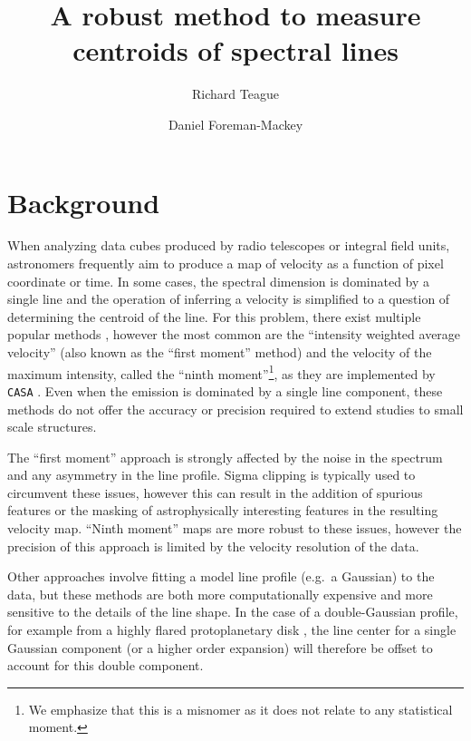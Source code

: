 \documentclass[rnaas]{aastex62}
\begin{document}
\raggedbottom\sloppy\sloppypar\frenchspacing

\title{%
A robust method to measure centroids of spectral lines
}

\author[0000-0003-1534-5186]{Richard Teague}

\author[0000-0002-9328-5652]{Daniel Foreman-Mackey}


\section{Background}

When analyzing data cubes produced by radio telescopes or integral field units,
astronomers frequently aim to produce a map of velocity as a function of pixel
coordinate or time.
In some cases, the spectral dimension is dominated by a single line and the
operation of inferring a velocity is simplified to a question of determining
the centroid of the line.
For this problem, there exist multiple popular methods \citep[see, for
example][]{deBlok:2008}, however the most common are the ``intensity weighted
average velocity'' (also known as the ``first moment'' method) and the
velocity of the maximum intensity, called the ``ninth moment''\footnote{We
emphasize that this is a misnomer as it does not relate to any statistical
moment.}, as they are implemented by \texttt{CASA} \citep{McMullin:2007}.
Even when the emission is dominated by a single line component, these methods
do not offer the accuracy or precision required to extend studies to small
scale structures.

The ``first moment'' approach is strongly affected by the noise in the spectrum
and any asymmetry in the line profile.
Sigma clipping is typically used to circumvent these issues, however this can
result in the addition of spurious features or the masking of astrophysically
interesting features in the resulting velocity map.
``Ninth moment'' maps are more robust to these issues, however the precision of
this approach is limited by the velocity resolution of the data.

Other approaches involve fitting a model line profile (e.g.~a Gaussian) to the
data, but these methods are both more computationally expensive and more
sensitive to the details of the line shape.
In the case of a double-Gaussian profile, for example from a highly flared
protoplanetary disk \citep{Rosenfeld:2013}, the line center for a single
Gaussian component (or a higher order expansion) will therefore be offset to
account for this double component.
\end{document}

